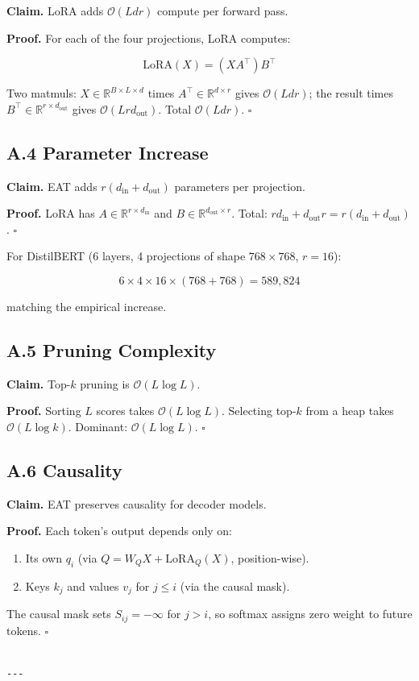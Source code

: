 \textbf{Claim.} LoRA adds $\mathcal{O}(L d r)$ compute per forward pass.

\textbf{Proof.} For each of the four projections, LoRA computes:

\[
\text{LoRA}(X) = (X A^\top) B^\top
\]

Two matmuls: $X \in \mathbb{R}^{B \times L \times d}$ times $A^\top \in \mathbb{R}^{d \times r}$ 
gives $\mathcal{O}(L d r)$; the result times $B^\top \in \mathbb{R}^{r \times d_\text{out}}$ 
gives $\mathcal{O}(L r d_\text{out})$. Total $\mathcal{O}(L d r)$. $\square$

\subsection{A.4 Parameter Increase}

\textbf{Claim.} EAT adds $r(d_\text{in} + d_\text{out})$ parameters per projection.

\textbf{Proof.} LoRA has $A \in \mathbb{R}^{r \times d_\text{in}}$ and 
$B \in \mathbb{R}^{d_\text{out} \times r}$. Total: $r d_\text{in} + d_\text{out} r = r(d_\text{in} + d_\text{out})$. $\square$

For DistilBERT (6 layers, 4 projections of shape $768 \times 768$, $r = 16$):

\[
6 \times 4 \times 16 \times (768 + 768) = 589{,}824
\]

matching the empirical increase.

\subsection{A.5 Pruning Complexity}

\textbf{Claim.} Top-$k$ pruning is $\mathcal{O}(L \log L)$.

\textbf{Proof.} Sorting $L$ scores takes $\mathcal{O}(L \log L)$. Selecting top-$k$ 
from a heap takes $\mathcal{O}(L \log k)$. Dominant: $\mathcal{O}(L \log L)$. $\square$

\subsection{A.6 Causality}

\textbf{Claim.} EAT preserves causality for decoder models.

\textbf{Proof.} Each token's output depends only on:

\begin{enumerate}
\item Its own $q_i$ (via $Q = W_Q X + \text{LoRA}_Q(X)$, position-wise).
\item Keys $k_j$ and values $v_j$ for $j \leq i$ (via the causal mask).

\end{enumerate}
The causal mask sets $S_{ij} = -\infty$ for $j > i$, so softmax assigns zero 
weight to future tokens. $\square$
\begin{lstlisting}

---
\end{lstlisting}


